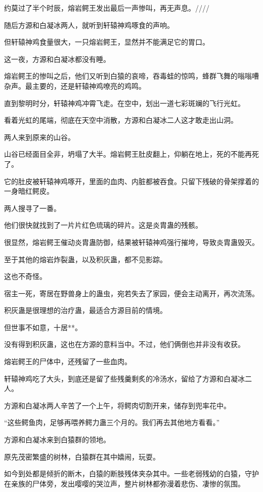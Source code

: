 
\begin{this_body}

约莫过了半个时辰，熔岩鳄王发出最后一声惨叫，再无声息。////

随后方源和白凝冰两人，就听到轩辕神鸡啄食的声响。

但轩辕神鸡食量很大，一只熔岩鳄王，显然并不能满足它的胃口。

这一夜，方源和白凝冰都没有睡。

熔岩鳄王的惨叫之后，他们又听到白猿的哀啼，吞毒蛙的惊鸣，蜂群飞舞的嗡嗡嘈杂声。最主要的，还是轩辕神鸡嘹亮的鸡鸣。

直到黎明时分，轩辕神鸡冲霄飞走。在空中，划出一道七彩斑斓的飞行光虹。

看着光虹的尾端，彻底在天空中消散，方源和白凝冰二人这才敢走出山洞。

两人来到原来的山谷。

山谷已经面目全非，坍塌了大半。熔岩鳄王肚皮翻上，仰躺在地上，死的不能再死了。

它的肚皮被轩辕神鸡啄开，里面的血肉、内脏都被吞食。只留下残破的骨架撑着的一身暗红鳄皮。

两人搜寻了一番。

他们很快就找到了一片片红色琉璃的碎片。这是炎胄蛊的残骸。

很显然，熔岩鳄王催动炎胄蛊防御，结果被轩辕神鸡强行摧垮，导致炎胄蛊毁灭。

至于其他的熔岩炸裂蛊，以及积灰蛊，都不见影踪。

这也不奇怪。

宿主一死，寄居在野兽身上的蛊虫，宛若失去了家园，便会主动离开，再次流荡。

积灰蛊是很理想的治疗蛊，最适合方源目前的情境。

但世事不如意，十居**。

没有得到积灰蛊，这也在方源的意料当中。不过，他们俩倒也并非没有收获。

熔岩鳄王的尸体中，还残留了一些血肉。

轩辕神鸡吃了大头，到底还是留了些残羹剩炙的冷汤水，留给了方源和白凝冰二人。

方源和白凝冰两人辛苦了一个上午，将鳄肉切割开来，储存到兜率花中。

“这些鳄鱼肉，足够再喂养鳄力蛊三个月的。我们再去其他地方看看。”

方源和白凝冰来到白猿群的领地。

原先茂密繁盛的树林，白猿群在其中嬉闹，玩耍。

如今到处都是倾折的断木，白猿的断肢残体夹杂其中。一些老弱残幼的白猿，守护在亲族的尸体旁，发出嘤嘤的哭泣声，整片树林都弥漫着悲伤、凄惨的氛围。


\end{this_body}
